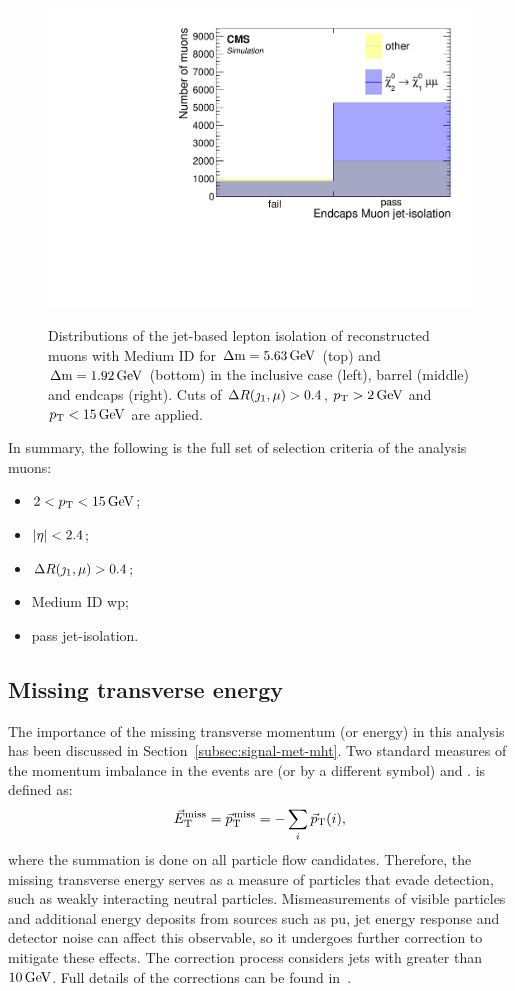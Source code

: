 \begin{figure}[!htb]
\includegraphics[width=0.32\linewidth]{plots/lepton_selection/lepton_selection_dm1p92/none_Muons_pt_endcape_jet_iso.pdf} \\
\caption[Distributions of the jet-based lepton isolation of reconstructed muons]{Distributions of the jet-based lepton isolation of reconstructed muons with Medium ID for $\Delta\mathrm{m}=5.63\,\text{Ge\hspace{-.08em}V}$ (top) and $\Delta\mathrm{m}=1.92\,\text{Ge\hspace{-.08em}V}$ (bottom) in the inclusive \pt case (left), barrel (middle) and endcaps (right). Cuts of $\Delta R(\jmath_1,\mu)>0.4$, $p_{\mathrm{T}}>2\,\text{Ge\hspace{-.08em}V}$ and $p_{\mathrm{T}}<15\,\text{Ge\hspace{-.08em}V}$ are applied.}
\label{fig:muons-selection-isolation}
\end{figure}

In summary, the following is the full set of selection criteria of the analysis muons:

\begin{itemize}
\item $2<p_{\mathrm{T}}<15\,\text{Ge\hspace{-.08em}V}$;
\item $\abs{\eta} < 2.4$;
\item $\Delta R(\jmath_1,\mu)>0.4$;
\item Medium ID \gls{wp};
\item pass jet-isolation.
\end{itemize}



\clearpage

\subsection{Missing transverse energy}
\label{subsec:met}

The importance of the missing transverse momentum (or energy) in this analysis has been discussed in Section~\ref{subsec:signal-met-mht}. Two standard measures of the momentum imbalance in the events are \VEtmiss (or \ptvecmiss by a different symbol) and \htvecmiss. \VEtmiss is defined as:
\begin{equation}
{\vec E}_{\mathrm{T}}^{\text{miss}} = {\vec p}_{\mathrm{T}}^{\kern1pt\text{miss}} = -\sum_i {\vec p}_{\mathrm{T}}(i),
\end{equation}
where the summation is done on all particle flow candidates. Therefore, the missing transverse energy serves as a measure of particles that evade detection, such as weakly interacting neutral particles. Mismeasurements of visible particles and additional energy deposits from sources such as \gls{pu}, jet energy response and detector noise can affect this observable, so it undergoes further correction to mitigate these effects. The correction process considers jets with \pt greater than $10\,\text{Ge\hspace{-.08em}V}$. Full details of the corrections can be found in~\cite{met_performance}.

